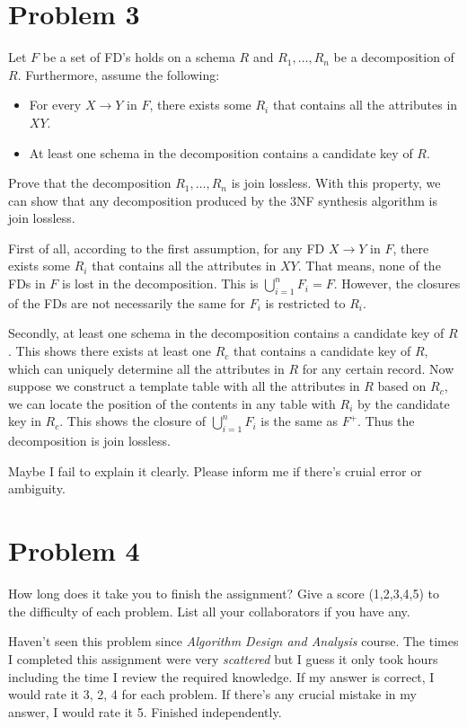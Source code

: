 \documentclass{article}
\begin{document}
\section*{Problem 3}
\begin{tcolorbox}[colback=gray!10, breakable]
	Let \( F \) be a set of FD's holds on a schema \( R \) and \( R_1, \dots, R_n \) be a decomposition of \( R \). Furthermore, assume the following:

	\begin{itemize}
		\item For every \( X \to Y \) in \( F \), there exists some \( R_i \) that contains all the attributes in \( XY \).
		\item At least one schema in the decomposition contains a candidate key of \( R \).
	\end{itemize}

	Prove that the decomposition \( R_1, \dots, R_n \) is join lossless. With this property, we can show that any decomposition produced by the 3NF synthesis algorithm is join lossless.
\end{tcolorbox}

First of all, according to the first assumption, for any FD $X \to Y$ in $F$, there exists some $R_i$ that contains all the attributes in $XY$. 
That means, none of the FDs in $F$ is lost in the decomposition. This is $\bigcup_{i=1}^{n} F_i = F$.
However, the closures of the FDs are not necessarily the same for $F_i$ is restricted to $R_i$. 

Secondly, at least one schema in the decomposition contains a candidate key of $R$. This shows there exists at least one $R_c$ that contains a candidate key of $R$, which can uniquely determine all the attributes in $R$ for any certain record.
Now suppose we construct a template table with all the attributes in $R$ based on $R_c$, we can locate the position of the contents in any table with $R_i$ by the candidate key in $R_c$.
This shows the closure of $\bigcup_{i=1}^{n} F_i$ is the same as $F^+$. Thus the decomposition is join lossless.

Maybe I fail to explain it clearly. Please inform me if there's cruial error or ambiguity.

\section*{Problem 4}
\begin{tcolorbox}[colback=gray!10, breakable]
	How long does it take you to finish the assignment? Give a score (1,2,3,4,5) to the difficulty of each problem. List all your collaborators if you have any.
\end{tcolorbox}

Haven't seen this problem since \textit{Algorithm Design and Analysis} course. 
The times I completed this assignment were very \textit{scattered} but I guess it only took hours including the time I review the required knowledge.
If my answer is correct, I would rate it 3, 2, 4 for each problem. If there's any crucial mistake in my answer, I would rate it 5.
Finished independently.
\end{document}

